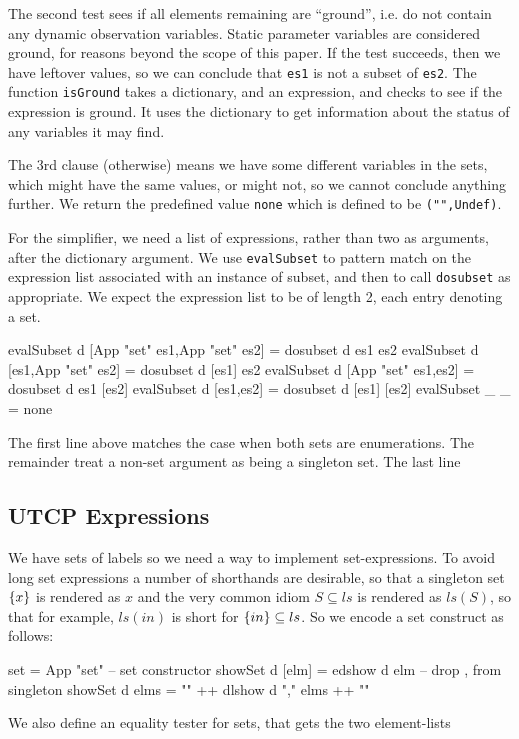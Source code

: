 The second test sees if all elements remaining are ``ground'',
i.e. do not contain any dynamic observation variables.
Static parameter variables are considered ground,
for reasons beyond the scope of this paper.
If the test succeeds, 
then we have leftover values, so we can conclude that \texttt{es1} is not a subset of \texttt{es2}.
The function \texttt{isGround} takes a dictionary,
and an expression, and checks to see if the expression is ground.
It uses the dictionary to get information about the status
of any variables it may find.

The 3rd clause (otherwise) means we have some different
variables in the sets, which might have the same values,
or might not, so we cannot conclude anything further.
We return the predefined value \texttt{none} which is defined to be 
\verb$("",Undef)$.

For the simplifier, we need a list of expressions,
rather than two as arguments, after the dictionary argument.
We use \texttt{evalSubset} to pattern match on the expression list
associated with an instance of subset,
and then to call \texttt{dosubset} as appropriate.
We expect the expression list to be of length 2,
each entry denoting a set.
\begin{code}
evalSubset d [App "set" es1,App "set" es2] = dosubset d es1 es2
evalSubset d [es1,App "set" es2] = dosubset d [es1] es2
evalSubset d [App "set" es1,es2] = dosubset d es1 [es2]
evalSubset d [es1,es2] = dosubset d [es1] [es2]
evalSubset _ _ = none
\end{code}
The first line above matches the case when both sets are enumerations.
The remainder treat a non-set argument as being a singleton set.
The last line 

\subsection{UTCP Expressions}

We have sets of labels
so we need a way to implement set-expressions.
To avoid long set expressions a number of shorthands are desirable,
so that a singleton set $\{{x}\}$ is rendered as $x$
and the very common idiom $S \subseteq ls$
is rendered as $ls(S)$,
so that for example, $ls(in)$ is short for $\{{in}\} \subseteq ls$.
So we encode a set construct as follows:
\begin{code}
set = App "set"                             -- set constructor
showSet d [elm] = edshow d elm      -- drop {,} from singleton
showSet d elms = "{" ++ dlshow d "," elms ++ "}"
\end{code}
We also define an equality tester for sets,
that gets the two element-lists


